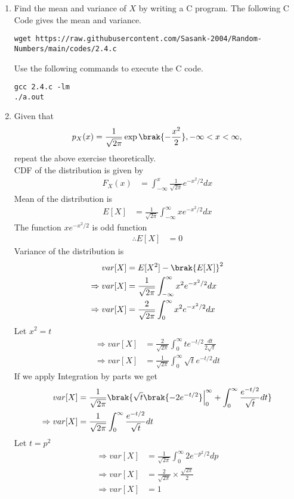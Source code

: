\documentclass[journal,12pt,twocolumn]{IEEEtran}
\renewcommand\thesection{\arabic{section}}
\begin{document}
\begin{enumerate}[label=\thesection.\arabic*
,ref=\thesection.\theenumi]
\item Find the mean and variance of $X$ by writing a C program.
\solution The following C Code gives the mean and variance. 
\begin{lstlisting}
wget https://raw.githubusercontent.com/Sasank-2004/Random-Numbers/main/codes/2.4.c
\end{lstlisting}
Use the following commands to execute the C code.
\begin{lstlisting}
gcc 2.4.c -lm
./a.out
\end{lstlisting}
\item Given that 
\begin{align}
p_{X}(x) = \frac{1}{\sqrt{2\pi}}\exp\brak{-\frac{x^2}{2}}, -\infty < x < \infty,
\end{align}
repeat the above exercise theoretically.\\
%
\solution CDF of the distribution is given by 
\begin{align}
    F_X(x)  &=  \int_{-\infty}^{x} \frac{1}{\sqrt{2\pi}} e^{-x^2/2} dx
\end{align}
Mean of the distribution is 
\begin{align}
    E[X] &= \frac{1}{\sqrt{2\pi}}\int_{-\infty}^{\infty} xe^{-x^2/2} dx 
\end{align}
The function $xe^{-x^2/2}$ is odd function 
\begin{align}
    \therefore E[X] &= 0
\end{align}
Variance of the distribution is 
\begin{align}
    var[X] &= E[X^2] - \brak{E[X]}^2 \\
    \Rightarrow var[X] &= \frac{1}{\sqrt{2\pi}}\int_{-\infty}^{\infty} x^2e^{-x^2/2} dx \\
    \Rightarrow var[X] &= \frac{2}{\sqrt{2\pi}}\int_{0}^{\infty} x^2e^{-x^2/2} dx
\end{align}
Let $x^2 = t$
\begin{align}
    \Rightarrow var[X] &= \frac{2}{\sqrt{2\pi}} \int_{0}^{\infty} t e^{-t/2} \frac{dt}{2\sqrt{t}} \\ 
    \Rightarrow var[X] &= \frac{1}{\sqrt{2\pi}} \int_{0}^{\infty} \sqrt{t} e^{-t/2} dt
\end{align}
If we apply Integration by parts we get 
\begin{align}
    var[X] &= \frac{1}{\sqrt{2\pi}} \brak{ \sqrt{t}\brak{-2e^{-t/2}}\Bigr|_{0}^{\infty} + \int_{0}^{\infty} \frac{e^{-t/2}}{\sqrt{t}} dt } \\
    \Rightarrow var[X] &= \frac{1}{\sqrt{2\pi}} \int_{0}^{\infty} \frac{e^{-t/2}}{\sqrt{t}} dt
\end{align}
Let $t=p^2$
\begin{align}
    \Rightarrow var[X] &= \frac{1}{\sqrt{2\pi}} \int_{0}^{\infty} 2e^{-p^2/2} dp \\
    \Rightarrow var[X] &= \frac{2}{\sqrt{2\pi}} \times \frac{\sqrt{2\pi}}{2} \\
    \Rightarrow var[X] &= 1
\end{align}
\end{enumerate}
\end{document}
